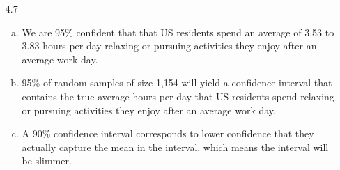 \documentclass[11pt]{article}
\newenvironment{parts}{
\vspace{-0.25cm}
\begin{enumerate}[(a)]
\setlength{\itemsep}{0mm}
}
{\end{enumerate}
}
\begin{document}
\begin{enumerate}
\item[4.7]
\begin{parts}
\item We are 95\% confident that that US residents spend an average of 3.53 to 3.83 hours per day relaxing or pursuing activities they enjoy after an average work day.
\item 95\% of random samples of size 1,154 will yield a confidence interval that contains the true average hours per day that US residents spend relaxing or pursuing activities they enjoy after an average work day.
\item A 90\% confidence interval corresponds to lower confidence that they actually capture the mean in the interval, which means the interval will be slimmer.
\end{parts}


\end{enumerate}
\end{document}
